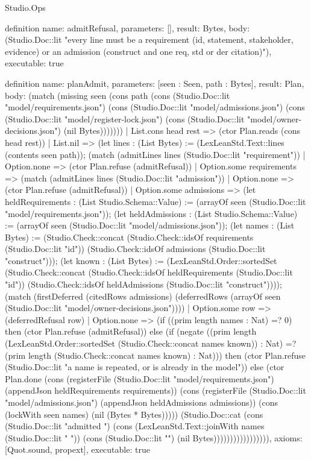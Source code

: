 \begin{lexlean}{Studio.Ops}
\begin{semanticmodule}
{definition{
  name: admitRefusal,
  parameters: [],
  result: Bytes,
  body: (Studio.Doc::lit "every line must be a requirement (id, statement, stakeholder, evidence) or an admission (construct and one req, std or der citation)\n"),
  executable: true
}

definition{
  name: planAdmit,
  parameters: [seen : Seen, path : Bytes],
  result: Plan,
  body: (match (missing seen (cons path (cons (Studio.Doc::lit "model/requirements.json") (cons (Studio.Doc::lit "model/admissions.json") (cons (Studio.Doc::lit "model/register-lock.json") (cons (Studio.Doc::lit "model/owner-decisions.json") (nil Bytes)))))))
    | List.cons head rest => (ctor Plan.reads (cons head rest))
    | List.nil => (let lines : (List Bytes) := (LexLeanStd.Text::lines (contents seen path)); (match (admitLines lines (Studio.Doc::lit "requirement"))
      | Option.none => (ctor Plan.refuse (admitRefusal))
      | Option.some requirements => (match (admitLines lines (Studio.Doc::lit "admission"))
        | Option.none => (ctor Plan.refuse (admitRefusal))
        | Option.some admissions => (let heldRequirements : (List Studio.Schema::Value) := (arrayOf seen (Studio.Doc::lit "model/requirements.json")); (let heldAdmissions : (List Studio.Schema::Value) := (arrayOf seen (Studio.Doc::lit "model/admissions.json")); (let names : (List Bytes) := (Studio.Check::concat (Studio.Check::idsOf requirements (Studio.Doc::lit "id")) (Studio.Check::idsOf admissions (Studio.Doc::lit "construct"))); (let known : (List Bytes) := (LexLeanStd.Order::sortedSet (Studio.Check::concat (Studio.Check::idsOf heldRequirements (Studio.Doc::lit "id")) (Studio.Check::idsOf heldAdmissions (Studio.Doc::lit "construct")))); (match (firstDeferred (citedRows admissions) (deferredRows (arrayOf seen (Studio.Doc::lit "model/owner-decisions.json"))))
          | Option.some row => (deferredRefusal row)
          | Option.none => (if ((prim length names : Nat) =? 0) then (ctor Plan.refuse (admitRefusal)) else (if (negate ((prim length (LexLeanStd.Order::sortedSet (Studio.Check::concat names known)) : Nat) =? (prim length (Studio.Check::concat names known) : Nat))) then (ctor Plan.refuse (Studio.Doc::lit "a name is repeated, or is already in the model\n")) else (ctor Plan.done (cons (registerFile (Studio.Doc::lit "model/requirements.json") (appendJson heldRequirements requirements)) (cons (registerFile (Studio.Doc::lit "model/admissions.json") (appendJson heldAdmissions admissions)) (cons (lockWith seen names) (nil (Bytes * Bytes))))) (Studio.Doc::cat (cons (Studio.Doc::lit "admitted ") (cons (LexLeanStd.Text::joinWith names (Studio.Doc::lit " ")) (cons (Studio.Doc::lit "\n") (nil Bytes))))))))))))))))),
  axioms: [Quot.sound, propext],
  executable: true
}

}
\end{semanticmodule}
\end{lexlean}
